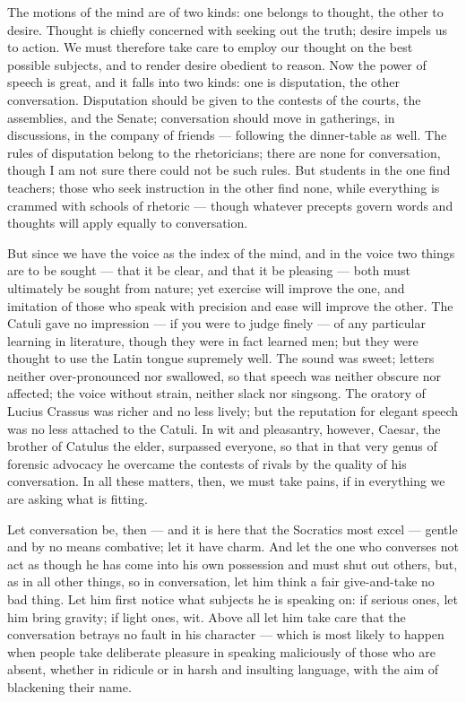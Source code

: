  The motions of the mind are of two kinds: one belongs to thought, the other to desire. Thought is chiefly concerned with seeking out the truth; desire impels us to action. We must therefore take care to employ our thought on the best possible subjects, and to render desire obedient to reason. Now the power of speech is great, and it falls into two kinds: one is disputation, the other conversation. Disputation should be given to the contests of the courts, the assemblies, and the Senate; conversation should move in gatherings, in discussions, in the company of friends — following the dinner-table as well. The rules of disputation belong to the rhetoricians; there are none for conversation, though I am not sure there could not be such rules. But students in the one find teachers; those who seek instruction in the other find none, while everything is crammed with schools of rhetoric — though whatever precepts govern words and thoughts will apply equally to conversation.

 But since we have the voice as the index of the mind, and in the voice two things are to be sought — that it be clear, and that it be pleasing — both must ultimately be sought from nature; yet exercise will improve the one, and imitation of those who speak with precision and ease will improve the other. The Catuli gave no impression — if you were to judge finely — of any particular learning in literature, though they were in fact learned men; but they were thought to use the Latin tongue supremely well. The sound was sweet; letters neither over-pronounced nor swallowed, so that speech was neither obscure nor affected; the voice without strain, neither slack nor singsong. The oratory of Lucius Crassus was richer and no less lively; but the reputation for elegant speech was no less attached to the Catuli. In wit and pleasantry, however, Caesar, the brother of Catulus the elder, surpassed everyone, so that in that very genus of forensic advocacy he overcame the contests of rivals by the quality of his conversation. In all these matters, then, we must take pains, if in everything we are asking what is fitting.

 Let conversation be, then — and it is here that the Socratics most excel — gentle and by no means combative; let it have charm. And let the one who converses not act as though he has come into his own possession and must shut out others, but, as in all other things, so in conversation, let him think a fair give-and-take no bad thing. Let him first notice what subjects he is speaking on: if serious ones, let him bring gravity; if light ones, wit. Above all let him take care that the conversation betrays no fault in his character — which is most likely to happen when people take deliberate pleasure in speaking maliciously of those who are absent, whether in ridicule or in harsh and insulting language, with the aim of blackening their name.

